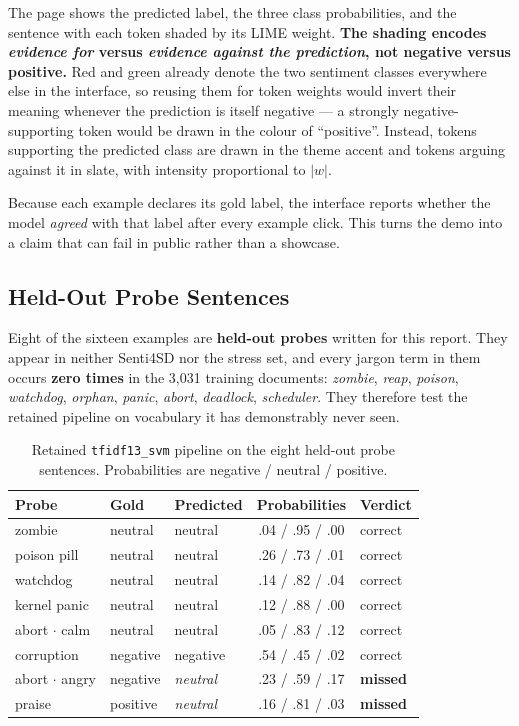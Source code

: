 \documentclass[11pt,a4paper]{article}
\begin{document}
The page shows the predicted label, the three class probabilities, and the
sentence with each token shaded by its LIME weight. \textbf{The shading encodes
\textit{evidence for} versus \textit{evidence against the prediction}, not
negative versus positive.} Red and green already denote the two sentiment
classes everywhere else in the interface, so reusing them for token weights
would invert their meaning whenever the prediction is itself negative ---
a strongly negative-supporting token would be drawn in the colour of
``positive''. Instead, tokens supporting the predicted class are drawn in the
theme accent and tokens arguing against it in slate, with intensity
proportional to $|w|$.

Because each example declares its gold label, the interface reports whether
the model \textit{agreed} with that label after every example click. This
turns the demo into a claim that can fail in public rather than a showcase.

\subsection{Held-Out Probe Sentences}
\label{sec:probes}

Eight of the sixteen examples are \textbf{held-out probes} written for this
report. They appear in neither Senti4SD nor the stress set, and every jargon
term in them occurs \textbf{zero times} in the 3,031 training documents:
\textit{zombie}, \textit{reap}, \textit{poison}, \textit{watchdog},
\textit{orphan}, \textit{panic}, \textit{abort}, \textit{deadlock},
\textit{scheduler}. They therefore test the retained pipeline on vocabulary it
has demonstrably never seen.

\begin{table}[H]
\centering
\caption{Retained \texttt{tfidf13\_svm} pipeline on the eight held-out probe
sentences. Probabilities are negative / neutral / positive.}
\label{tab:probes}
\footnotesize
\begin{tabular}{lllcl}
\toprule
\textbf{Probe} & \textbf{Gold} & \textbf{Predicted} & \textbf{Probabilities} & \textbf{Verdict} \\
\midrule
zombie        & neutral  & neutral  & .04 / .95 / .00 & correct \\
poison pill   & neutral  & neutral  & .26 / .73 / .01 & correct \\
watchdog      & neutral  & neutral  & .14 / .82 / .04 & correct \\
kernel panic  & neutral  & neutral  & .12 / .88 / .00 & correct \\
abort $\cdot$ calm  & neutral  & neutral  & .05 / .83 / .12 & correct \\
corruption    & negative & negative & .54 / .45 / .02 & correct \\
abort $\cdot$ angry & negative & \textit{neutral} & .23 / .59 / .17 & \textbf{missed} \\
praise        & positive & \textit{neutral} & .16 / .81 / .03 & \textbf{missed} \\
\bottomrule
\end{tabular}
\end{table}
\end{document}

